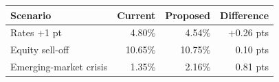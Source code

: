 \begin{tabular}{@{}lrrr@{}}
\toprule
\textbf{Scenario} & \textbf{Current} & \textbf{Proposed} & \textbf{Difference} \\
\midrule
Rates +1 pt & \textminus{}4.80\% & \textminus{}4.54\% & +0.26 pts \\
Equity sell-off & \textminus{}10.65\% & \textminus{}10.75\% & \textminus{}0.10 pts \\
Emerging-market crisis & \textminus{}1.35\% & \textminus{}2.16\% & \textminus{}0.81 pts \\
\bottomrule
\end{tabular}